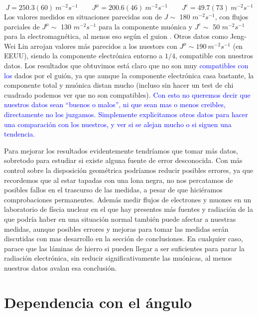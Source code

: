 \documentclass[11pt]{article}
\begin{document}
\begin{equation}
	J = 250.3(60)  \ \unit{m^{-2}s^{-1}} \qquad 
	J^\mu = 200.6(46) \ \unit{m^{-2}s^{-1}} \qquad 
	J^e = 49.7(73) \ \unit{m^{-2}s^{-1}}
\end{equation}
Los valores medidos en situaciones parecidas son de $ J \sim$ 180 $ \unit{m^{-2}s^{-1}}$, con flujos parciales de $J^\mu \sim$ 130 $ \unit{m^{-2}s^{-1}}$ para la componente muónica y $J^e \sim$ 50 $ \unit{m^{-2}s^{-1}}$ para la electromagnética, al menos eso según el guion \cite{P2}. Otros datos como Jeng-Wei Lin \cite{LIN201024} arrojan valores más parecidos a los nuestors con $J^\mu\sim 190 \ \unit{m^{-2}s^{-1}}$ (en EEUU), siendo la componente electrónica entorno a $1/4$, compatible con nuestros datos. Los resultados que obtuvimos está claro que no son muy \textcolor{blue}{compatibles con los} dados por el guión, ya que aunque la componente electrónica casa bastante, la componente total y muónica distan mucho (incluso sin hacer un test de chi cuadrado podemos ver que no son compatibles). \textcolor{blue}{Con esto no queremos decir que nuestros datos sean ``buenos o malos'', ni que sean mas o menos creibles, directamente no los juzgamos. Simplemente explicitamos otros datos para hacer una comparación con los nuestros, y ver si se alejan mucho o si siguen una tendencia.} 


Para mejorar los resultados evidentemente tendríamos que tomar más datos, sobretodo para estudiar si existe alguna fuente de error desconocida. Con más control sobre la disposición geométrica podríamos reducir posibles errores, ya que recordemos que al estar tapadas con una lona negra, no nos percatamos de posibles fallos en el trascurso de las medidas, a pesar de que hiciéramos comprobaciones permanentes. Además medir flujos de electrones y muones en un laboratorio de físcia nuclear en el que hay presentes más fuentes y radiación de la que podría haber en una situación normal también puede afectar a nuestras medidas, aunque posibles errores y mejoras para tomar las medidas serán discutidas con mas desarrollo en la sección de conclusiones. En cualquier caso, parace que las láminas de hierro si pueden llegar a ser suficientes para parar la radiación electrónica, sin reducir significativamente las muónicas, al menos nuestros datos avalan esa conclusión.

\section{Dependencia con el ángulo}
\end{document}
